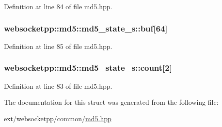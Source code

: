 Definition at line 84 of file md5.\+hpp.

\hypertarget{structwebsocketpp_1_1md5_1_1md5__state__s_a4d3bae1432efcd8e294b910ee01ef39a}{}
\subsubsection[{buf}]{ websocketpp\+::md5\+::md5\+\_\+state\+\_\+s\+::buf\mbox{[}64\mbox{]}}\label{structwebsocketpp_1_1md5_1_1md5__state__s_a4d3bae1432efcd8e294b910ee01ef39a}


Definition at line 85 of file md5.\+hpp.

\hypertarget{structwebsocketpp_1_1md5_1_1md5__state__s_a749f80b1f08f2e740e63a05a8821cf5c}{}
\subsubsection[{count}]{ websocketpp\+::md5\+::md5\+\_\+state\+\_\+s\+::count\mbox{[}2\mbox{]}}\label{structwebsocketpp_1_1md5_1_1md5__state__s_a749f80b1f08f2e740e63a05a8821cf5c}


Definition at line 83 of file md5.\+hpp.



The documentation for this struct was generated from the following file\+:\begin{DoxyCompactItemize}
\item 
ext/websocketpp/common/\hyperlink{md5_8hpp}{md5.\+hpp}\end{DoxyCompactItemize}
